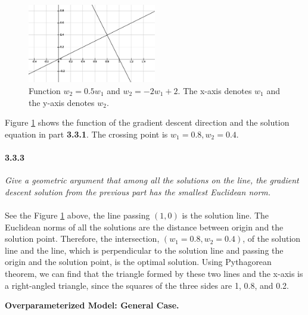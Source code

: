 \documentclass{myhw}
\begin{document}
\begin{homeworkProblem}
\begin{homeworkSection}
\begin{figure}[ht]
  \centering
  \includegraphics[width=0.5\textwidth]{a3.eps} 
  \caption{Function $w_2 = 0.5 w_1$ and $w_2 = -2 w_1 + 2$. The x-axis denotes $w_1$ and the y-axis denotes $w_2$.}
  \label{fig:q3.3}
\end{figure}
Figure \ref{fig:q3.3} shows the function of the gradient descent direction and the solution equation in part \textbf{3.3.1}. The crossing point is $w_1 = 0.8, w_2 = 0.4$.
\paragraph{3.3.3} \emph{Give a geometric argument that among all the solutions on the line, the gradient descent solution from the previous part has the smallest Euclidean norm.} \\
\\
See the Figure \ref{fig:q3.3} above, the line passing $(1, 0)$ is the solution line. The Euclidean norms of all the solutions are the distance between origin and the solution point. Therefore, the intersection, $(w_1 = 0.8, w_2=0.4)$, of the solution line and the line, which is perpendicular to the solution line and passing the origin and the solution point, is the optimal solution. Using Pythagorean theorem, we can find that the triangle formed by these two lines and the x-axis is a right-angled triangle, since the squares of the three sides are 1, 0.8, and 0.2.
\end{homeworkSection}
\begin{homeworkSection}
\textbf{Overparameterized Model: General Case.}

\end{homeworkSection}
\end{homeworkProblem}
\end{document}
